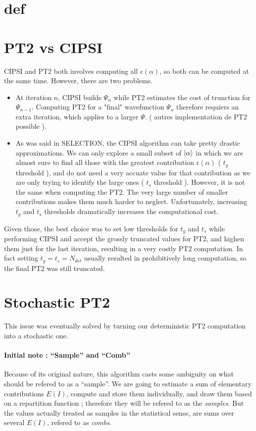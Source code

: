 \section{def}

\section{PT2 vs CIPSI}

CIPSI and PT2 both involves computing all $\epsilon(\alpha)$, so both can be computed at the same time. However, there are two problems.
\begin{itemize}

\item
At iteration $n$, CIPSI builds $\Psi_n$ while PT2 estimates the cost of trunction for $\Psi_{n-1}$. Computing PT2 for a "final" wavefunction $\Psi_n$ therefore requiers an extra iteration, which applies to a larger $\Psi$. ( autres implementation de PT2 possible ).

\item
As was said in SELECTION, the CIPSI algorithm can take pretty drastic approximations. We can only explore a small subset of $| \alpha \rangle$ in which we are almost sure to find all those with the greatest contribution $\epsilon(\alpha)$ ( $t_g$ threshold ), and do not need a very accuate value for that contribution as we are only trying to identify the large ones ( $t_s$ threshold ). However, it is not the same when computing the PT2. The very large number of smaller contributions makes them much harder to neglect. Unfortunately, increasing $t_g$ and $t_s$ thresholds dramatically increases the computational cost.

\end{itemize}

Given those, the best choice was to set low thresholds for $t_g$ and $t_s$ while performing CIPSI and accept the grossly truncated values for PT2, and highen them just for the last iteration, resulting in a very costly PT2 computation. In fact setting $t_g = t_s = N_{det}$ usually resulted in prohibitively long computation, so the final PT2 was still truncated.

\section{Stochastic PT2}
This issue was eventually solved by turning our deterministic PT2 computation into a stochastic one.

\paragraph{Initial note : ``Sample'' and ``Comb''}
Because of its original nature, this algorithm casts some ambiguity on what should be refered to as a ``sample''. We are going to estimate a sum of elementary contributions $E(I)$, compute and store them individually, and draw them based on a repartition function ; therefore they will be refered to as the \emph{samples}. But the values actually treated as samples in the statistical sense, are sums over several $E(I)$, refered to as \emph{combs}.



